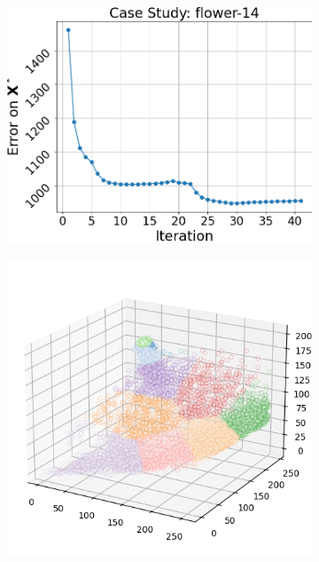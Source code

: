 \begin{figure}[htbp]
\begin{subfigure}[t]{0.32\textwidth}
    \end{subfigure}
    \begin{subfigure}[t]{0.32\textwidth}
        \includegraphics[width=\linewidth]{../../python_code/plots/kmeans/flower-14/elbow_curve.png}
    \end{subfigure}
    \begin{subfigure}[t]{0.32\textwidth}
        \includegraphics[width=\linewidth]{../../python_code/plots/kmeans/flower-14/clusters_elev20_azim-60.png}

\end{subfigure}
\end{figure}
